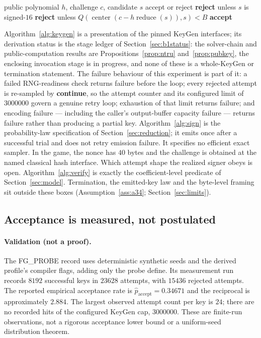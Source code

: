 \begin{algorithm}[!htbp]
\caption{FT1536 coefficient-level verification}\label{alg:verify}
\begin{algorithmic}[1]
\Require public polynomial $h$, challenge $c$, candidate $s$
\Ensure accept or reject
\State \textbf{reject} unless $s$ is signed-$16$
\State \textbf{reject} unless
  $Q(\operatorname{center}(c-h\operatorname{reduce}(s)),s)<B$
\State \textbf{accept}
\end{algorithmic}
\end{algorithm}

\noindent Algorithm~\ref{alg:keygen} is a presentation of the pinned
KeyGen interfaces; its derivation status is the stage ledger of
Section~\ref{sec:b1status}: the solver-chain and public-computation
results are Propositions~\ref{prop:ntru} and~\ref{prop:pubkey}, the
enclosing invocation stage is in progress, and none of these is a
whole-KeyGen or termination statement. The failure behaviour of this
experiment is part of it: a failed RNG-readiness check returns failure
before the loop; every rejected attempt is re-sampled by
\textbf{continue}, so the attempt counter and its configured limit of
$3000000$ govern a genuine retry loop; exhaustion of that limit returns
failure; and encoding failure --- including the caller's output-buffer
capacity failure --- returns failure rather than producing a partial
key. Algorithm~\ref{alg:sign} is the probability-law
specification of Section~\ref{sec:reduction}; it emits once after a
successful trial and does not retry emission failure. It specifies no
efficient exact sampler. In the game, the nonce has $40$ bytes and the
challenge is obtained at the named classical hash interface. Which
attempt shape the realized signer obeys is open.
Algorithm~\ref{alg:verify} is exactly the
coefficient-level predicate of Section~\ref{sec:model}. Termination, the
emitted-key law and the byte-level framing sit outside these boxes
(Assumption~\ref{ass:a34}; Section~\ref{sec:limits}).

\subsection{Acceptance is measured, not postulated}
\paragraph{Validation (not a proof).}
The FG\_PROBE record uses deterministic synthetic seeds and the derived
profile's compiler flags, adding only the probe define. Its measurement
run records $8192$ successful keys in $23628$ attempts, with
$15436$ rejected attempts. The reported empirical acceptance rate is
$\widehat p_{\mathrm{accept}}=0.34671$ and the reciprocal is approximately
$2.884$. The largest observed attempt count per key is $24$; there are
no recorded hits of the configured KeyGen cap, $3000000$. These are
finite-run observations, not a rigorous acceptance lower bound or a
uniform-seed distribution theorem.

